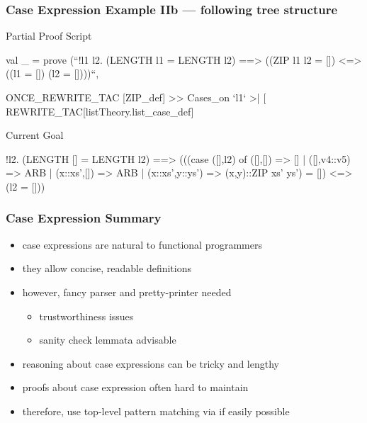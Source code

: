 \begin{frame}[fragile]
\frametitle{Case Expression Example IIb --- following tree structure}

\begin{block}{Partial Proof Script}
\begin{semiverbatim}\scriptsize
val _ = prove (``!l1 l2. 
  (LENGTH l1 = LENGTH l2) ==> 
  ((ZIP l1 l2 = []) <=> ((l1 = []) \holAnd{} (l2 = [])))``,

ONCE_REWRITE_TAC [ZIP_def] >>
Cases_on `l1` >| [
  REWRITE_TAC[listTheory.list_case_def] 
\end{semiverbatim}
\end{block}


\begin{block}{Current Goal}
\begin{semiverbatim}\scriptsize
!l2.
  (LENGTH [] = LENGTH l2) ==>
  (((case ([],l2) of
       ([],[]) => []
     | ([],v4::v5) => ARB
     | (x::xs',[]) => ARB
     | (x::xs',y::ys') => (x,y)::ZIP xs' ys') =
    []) <=> (l2 = []))
\end{semiverbatim}
\end{block}
\end{frame}


\begin{frame}[fragile]
\frametitle{Case Expression Summary}

\begin{itemize}
\item case expressions are natural to functional programmers
\item they allow concise, readable definitions
\item however, fancy parser and pretty-printer needed
\begin{itemize}
\item trustworthiness issues
\item sanity check lemmata advisable
\end{itemize}
\item reasoning about case expressions can be tricky and lengthy
\item proofs about case expression often hard to maintain
\item therefore, use top-level pattern matching via  if easily possible
\end{itemize}
\end{frame}


